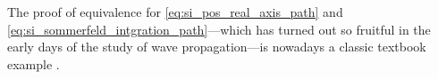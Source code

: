 The proof of equivalence for \eqref{eq:si_pos_real_axis_path} and
\eqref{eq:si_sommerfeld_intgration_path}---which has turned out so fruitful in
the early days of the study of wave propagation---is nowadays a classic textbook
example \cite[p.~203]{Sommerfeld1964}.










	




